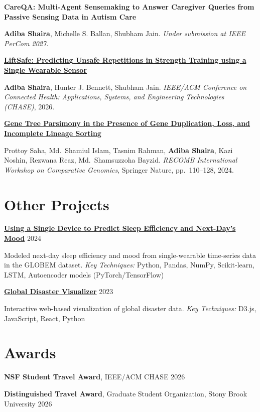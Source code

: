 \documentclass[10pt, letterpaper]{article}
\newcommand{\entry}[2]{\par\noindent #1 \hfill #2\par}
\newcommand{\publication}[3]{\par\noindent\textbf{#1}\par\noindent #2. #3\par}
\newcommand{\me}{\textbf{Adiba Shaira}}
\begin{document}
\publication{CareQA: Multi-Agent Sensemaking to Answer Caregiver Queries from Passive Sensing Data in Autism Care}
{\me, Michelle S. Ballan, Shubham Jain}
{\textit{Under submission at IEEE PerCom 2027.}}

\vspace{0.08 cm}
\publication{\href{https://picasso.cs.stonybrook.edu/bibcite/reference/47}{LiftSafe: Predicting Unsafe Repetitions in Strength Training using a Single Wearable Sensor}}
{\me, Hunter J. Bennett, Shubham Jain}
{\textit{IEEE/ACM Conference on Connected Health: Applications, Systems, and Engineering Technologies (CHASE)}, 2026.}

\vspace{0.08 cm}
\publication{\href{https://dl.acm.org/doi/10.1007/978-3-031-58072-7_6}{Gene Tree Parsimony in the Presence of Gene Duplication, Loss, and Incomplete Lineage Sorting}}
{Prottoy Saha, Md.\ Shamiul Islam, Tasnim Rahman, \me, Kazi Noshin, Rezwana Reaz, Md.\ Shamsuzzoha Bayzid}
{\textit{RECOMB International Workshop on Comparative Genomics}, Springer Nature, pp.\ 110--128, 2024.}

\section{Other Projects}

\entry{\textbf{\href{https://github.com/jamaliasultana/sleep_anomaly}{Using a Single Device to Predict Sleep Efficiency and Next-Day's Mood}}}{2024}
Modeled next-day sleep efficiency and mood from single-wearable time-series data in the GLOBEM dataset. \textit{Key Techniques:} Python, Pandas, NumPy, Scikit-learn, LSTM, Autoencoder models (PyTorch/TensorFlow)

\vspace{0.08 cm}
\entry{\textbf{\href{https://github.com/shahrarfatemi/global_disaster_visualizer}{Global Disaster Visualizer}}}{2023}
Interactive web-based visualization of global disaster data. \textit{Key Techniques:} D3.js, JavaScript, React, Python

\section{Awards}

\entry{\textbf{NSF Student Travel Award}, IEEE/ACM CHASE}{2026}
\entry{\textbf{Distinguished Travel Award}, Graduate Student Organization, Stony Brook University}{2026}
\end{document}
